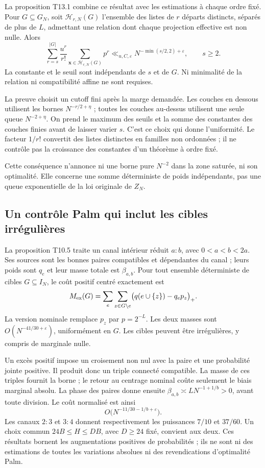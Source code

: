 \documentclass[11pt,a4paper]{article}
\begin{document}
La proposition T13.1 combine ce résultat avec les estimations à chaque ordre fixé. Pour $G\subseteq G_N$, soit $\mathcal H_{r,N}(G)$ l'ensemble des listes de $r$ départs distincts, séparés de plus de $L$, admettant une relation dont chaque projection effective est non nulle. Alors
\[
 \sum_{r=s}^{|G|}\frac{u^r}{r!}
     \sum_{\boldsymbol x\in\mathcal H_{r,N}(G)}p^r
 \ll_{u,C,\varepsilon}N^{-\min(s/2,2)+\varepsilon},
 \qquad s\ge2.
\]
La constante et le seuil sont indépendants de $s$ et de $G$. Ni minimalité de la relation ni compatibilité affine ne sont requises.

La preuve choisit un cutoff fini après la marge demandée. Les couches en dessous utilisent les bornes $N^{-r/2+\eta}$ ; toutes les couches au-dessus utilisent une seule queue $N^{-2+\eta}$. On prend le maximum des seuils et la somme des constantes des couches finies avant de laisser varier $s$. C'est ce choix qui donne l'uniformité. Le facteur $1/r!$ convertit des listes distinctes en familles non ordonnées ; il ne contrôle pas la croissance des constantes d'un théorème à ordre fixé.

Cette conséquence n'annonce ni une borne pure $N^{-2}$ dans la zone saturée, ni son optimalité. Elle concerne une somme déterministe de poids indépendants, pas une queue exponentielle de la loi originale de $Z_N$.

\subsection{Un contrôle Palm qui inclut les cibles irrégulières}

La proposition T10.5 traite un canal intérieur réduit $a:b$, avec $0<a<b<2a$. Ses sources sont les bonnes paires compatibles et dépendantes du canal ; leurs poids sont $q_e$ et leur masse totale est $\beta_{a,b}$. Pour tout ensemble déterministe de cibles $G\subseteq I_N$, le coût positif centré exactement est
\[
 M_{\rm ex}(G)=\sum_e\sum_{z\in G\setminus e}
       \bigl(q(e\cup\{z\})-q_ep_z\bigr)_+.
\]
La version nominale remplace $p_z$ par $p=2^{-L}$. Les deux masses sont $O(N^{-41/30+\varepsilon})$, uniformément en $G$. Les cibles peuvent être irrégulières, y compris de marginale nulle.

Un excès positif impose un croisement non nul avec la paire et une probabilité jointe positive. Il produit donc un triple connecté compatible. La masse de ces triples fournit la borne ; le retour au centrage nominal coûte seulement le biais marginal absolu. La phase des paires donne ensuite $\beta_{a,b}\asymp LN^{-1+1/b}>0$, avant toute division. Le coût normalisé est ainsi
\[
 O\bigl(N^{-11/30-1/b+\varepsilon}\bigr).
\]
Les canaux $2:3$ et $3:4$ donnent respectivement les puissances $7/10$ et $37/60$. Un choix commun $24B\le H\le DB$, avec $D\ge24$ fixé, convient aux deux. Ces résultats bornent les augmentations positives de probabilités ; ils ne sont ni des estimations de toutes les variations absolues ni des revendications d'optimalité Palm.
\end{document}
